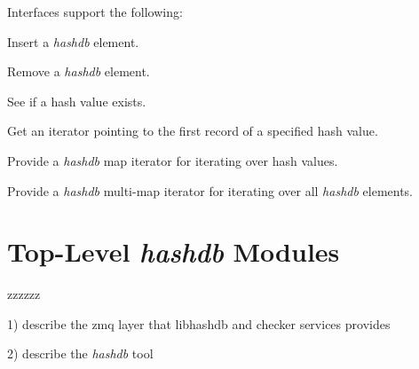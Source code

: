 \documentclass[12pt,twoside]{article}
\newcommand{\hdb}{\emph{hashdb}\xspace}
\begin{document}
Interfaces support the following:
\begin{compactitem}
\item Insert a \hdb element.
\item Remove a \hdb element.
\item See if a hash value exists.
\item Get an iterator pointing to the first record of a specified hash value.
\item Provide a \hdb map iterator for iterating over hash values.
\item Provide a \hdb multi-map iterator for iterating over all \hdb elements.
\end{compactitem}

\section{Top-Level \hdb Modules}
zzzzzz

1) describe the zmq layer that libhashdb and checker services provides

2) describe the \hdb tool
\end{document}

